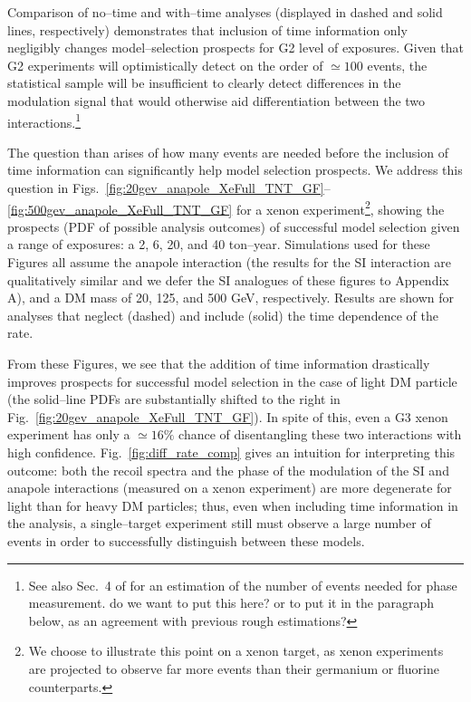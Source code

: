 \documentclass[11pt]{article}
\newcommand{\Fig}[1]{Fig.~\ref{#1}} \newcommand{\Figs}[2]{Figs.~\ref{#1} and \ref{#2}}
\newcommand{\vgColor}{magenta}
\newcommand{\vg}[1]{{\color{\vgColor} #1}}
\begin{document}
Comparison of no--time and with--time analyses (displayed in dashed and solid lines, respectively) demonstrates that inclusion of time information only negligibly changes model--selection prospects for G2 level of exposures. Given that G2 experiments will optimistically detect on the order of $\simeq 100$ events, the statistical sample will be insufficient to clearly detect differences in the modulation signal that would otherwise aid differentiation between the two interactions.\footnote{See also Sec.~4 of \cite{DelNobile:2015nua} for an estimation of the number of events needed for phase measurement. \vg{do we want to put this here? or to put it in the paragraph below, as an agreement with previous rough estimations?}}

The question than arises of how many events are needed before the inclusion of time information can significantly help model selection prospects. We address this question in Figs.~\ref{fig:20gev_anapole_XeFull_TNT_GF}--\ref{fig:500gev_anapole_XeFull_TNT_GF} for a xenon experiment\footnote{We choose to illustrate this point on a xenon target, as xenon experiments are projected to observe far more events than their germanium or fluorine counterparts.}, showing the prospects (PDF of possible analysis outcomes) of successful model selection given a range of exposures: a 2, 6, 20, and 40 ton--year. Simulations used for these Figures all assume the anapole interaction (the results for the SI interaction are qualitatively similar and we defer the SI analogues of these figures to Appendix A), and a DM mass of 20, 125, and 500 GeV, respectively. Results are shown for analyses that neglect (dashed) and include (solid) the time dependence of the rate. 

From these Figures, we see that the addition of time information drastically improves prospects for successful model selection in the case of light DM particle (the solid--line PDFs are substantially shifted to the right in \Fig{fig:20gev_anapole_XeFull_TNT_GF}). In spite of this, even a G3 xenon experiment has only a $\simeq 16\%$ chance of disentangling these two interactions with high confidence. \Fig{fig:diff_rate_comp} gives an intuition for interpreting this outcome: both the recoil spectra and the phase of the modulation of the SI and anapole interactions (measured on a xenon experiment) are more degenerate for light than for heavy DM particles; thus, even when including time information in the analysis, a single--target experiment still must observe a large number of events in order to successfully distinguish between these models.
\end{document}

